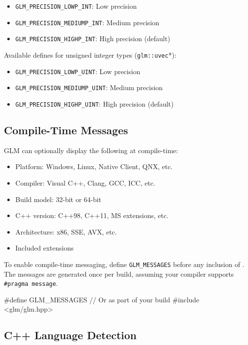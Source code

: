 \documentclass{scrartcl}
\numberwithin{figure}{subsection}
\begin{document}
\begin{itemize}
    \item \verb|GLM_PRECISION_LOWP_INT|: Low precision
    \item \verb|GLM_PRECISION_MEDIUMP_INT|: Medium precision 
    \item \verb|GLM_PRECISION_HIGHP_INT|: High precision (default)
\end{itemize}

Available defines for unsigned integer types (\verb|glm::uvec|*):

\begin{itemize}
    \item \verb|GLM_PRECISION_LOWP_UINT|: Low precision
    \item \verb|GLM_PRECISION_MEDIUMP_UINT|: Medium precision 
    \item \verb|GLM_PRECISION_HIGHP_UINT|: High precision (default)
\end{itemize}

\subsection{Compile-Time Messages}

GLM can optionally display the following at compile-time:

\begin{itemize}
    \item Platform: Windows, Linux, Native Client, QNX, etc. 
    \item Compiler: Visual C++, Clang, GCC, ICC, etc.
    \item Build model: 32-bit or 64-bit
    \item C++ version: C++98, C++11, MS extensions, etc.
    \item Architecture: x86, SSE, AVX, etc.
    \item Included extensions
\end{itemize}

To enable compile-time messaging, define \verb|GLM_MESSAGES| before any inclusion of . The messages are generated once per build, assuming your compiler supports \verb|#pragma message|.

\begin{cppcode}
#define GLM_MESSAGES  // Or as part of your build
#include <glm/glm.hpp>
\end{cppcode}

\subsection{C++ Language Detection}
\end{document}
